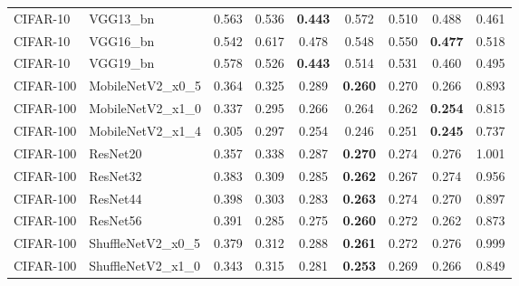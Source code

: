 \begin{table}[h!]
{\begin{tabular}{llccccccc}
 CIFAR-10 &          VGG13\_bn &         0.563 &                  0.536 & \textbf{0.443} &                  0.572 &                  0.510 &                  0.488 &                  0.461 \\
 CIFAR-10 &          VGG16\_bn &         0.542 &                  0.617 &                  0.478 &                  0.548 &                  0.550 & \textbf{0.477} &                  0.518 \\
 CIFAR-10 &          VGG19\_bn &         0.578 &                  0.526 & \textbf{0.443} &                  0.514 &                  0.531 &                  0.460 &                  0.495 \\
CIFAR-100 &  MobileNetV2\_x0\_5 &         0.364 &                  0.325 &                  0.289 & \textbf{0.260} &                  0.270 &                  0.266 &                  0.893 \\
CIFAR-100 &  MobileNetV2\_x1\_0 &         0.337 &                  0.295 &                  0.266 &                  0.264 &                  0.262 & \textbf{0.254} &                  0.815 \\
CIFAR-100 &  MobileNetV2\_x1\_4 &         0.305 &                  0.297 &                  0.254 &                  0.246 &                  0.251 & \textbf{0.245} &                  0.737 \\
CIFAR-100 &          ResNet20 &         0.357 &                  0.338 &                  0.287 & \textbf{0.270} &                  0.274 &                  0.276 &                  1.001 \\
CIFAR-100 &          ResNet32 &         0.383 &                  0.309 &                  0.285 & \textbf{0.262} &                  0.267 &                  0.274 &                  0.956 \\
CIFAR-100 &          ResNet44 &         0.398 &                  0.303 &                  0.283 & \textbf{0.263} &                  0.274 &                  0.270 &                  0.897 \\
CIFAR-100 &          ResNet56 &         0.391 &                  0.285 &                  0.275 & \textbf{0.260} &                  0.272 &                  0.262 &                  0.873 \\
CIFAR-100 & ShuffleNetV2\_x0\_5 &         0.379 &                  0.312 &                  0.288 & \textbf{0.261} &                  0.272 &                  0.276 &                  0.999 \\
CIFAR-100 & ShuffleNetV2\_x1\_0 &         0.343 &                  0.315 &                  0.281 & \textbf{0.253} &                  0.269 &                  0.266 &                  0.849 \\

\end{tabular}}
\end{table}
